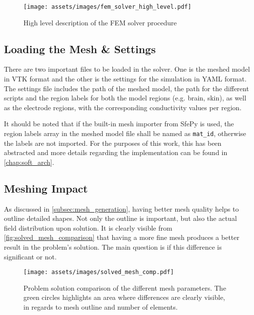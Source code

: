 \begin{figure}[H]
    \centering
    \texttt{[image: assets/images/fem\_solver\_high\_level.pdf]}
    \caption{High level description of the \gls{FEM} solver procedure}
    \label{fig:solver_high_level}
\end{figure}

\subsection{Loading the Mesh \& Settings}

There are two important files to be loaded in the solver. One is the meshed model in \gls{VTK} format and the other is the settings for the simulation in \gls{YAML} format. The settings file includes the path of the meshed model, the path for the different scripts and the region labels for both the model regions (e.g. brain, skin), as well as the electrode regions, with the corresponding conductivity values per region.

It should be noted that if the built-in mesh importer from SfePy is used, the region labels array in the meshed model file shall be named as \texttt{mat\_id}, otherwise the labels are not imported. For the purposes of this work, this has been abstracted and more details regarding the implementation can be found in \autoref{chap:soft_arch}.

\subsection{Meshing Impact}
\label{sec:mesh_quality}

As discussed in \ref{subsec:mesh_generation}, having better mesh quality helps to outline detailed shapes. Not only the outline is important, but also the actual field distribution upon solution. It is clearly visible from \autoref{fig:solved_mesh_comparison} that having a more fine mesh produces a better result in the problem's solution. The main question is if this difference is significant or not.

\begin{figure}[H]
    \centering
    \texttt{[image: assets/images/solved\_mesh\_comp.pdf]}
    \caption[Problem solution comparison for the different $q$ mesh parameters.]{Problem solution comparison of the different mesh parameters. The green circles highlights an area where differences are clearly visible, in regards to mesh outline and number of elements.}
    \label{fig:solved_mesh_comparison}
\end{figure}

